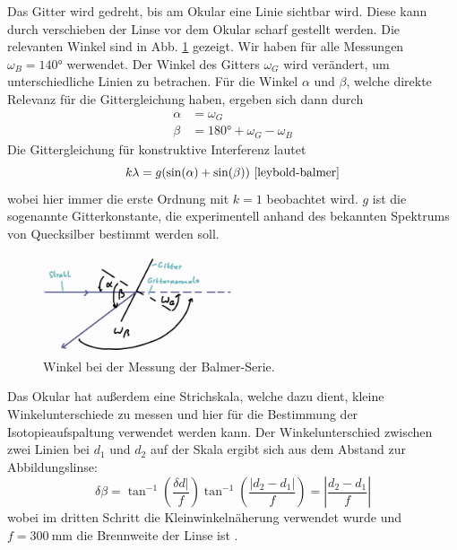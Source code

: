 \documentclass{article}
\begin{document}
Das Gitter wird gedreht, bis am Okular eine Linie sichtbar wird. Diese kann durch verschieben der Linse vor dem Okular scharf gestellt werden.
Die relevanten Winkel sind in Abb. \ref{fig:balmer-winkel} gezeigt. Wir haben für alle Messungen $\omega_B = \ang{140}$ werwendet.
Der Winkel des Gitters $\omega_G$ wird verändert, um unterschiedliche Linien zu betrachen. Für die Winkel $\alpha$ und $\beta$, welche
direkte Relevanz für die Gittergleichung haben, ergeben sich dann durch
\begin{align}
  \alpha &= \omega_G \nonumber \\
  \beta &= \ang{180} + \omega_G - \omega_B \label{eq:balmer-winkel}
\end{align}
Die Gittergleichung für konstruktive Interferenz lautet
\begin{equation}
  k\lambda = g(\sin(\alpha) + \sin(\beta)) \label{eq:gittergleichung}\ \cite{leybold-balmer}
\end{equation}
wobei hier immer die erste Ordnung mit $k=1$ beobachtet wird. $g$ ist die sogenannte Gitterkonstante,
die experimentell anhand des bekannten Spektrums von Quecksilber bestimmt werden soll.

\begin{figure}[h]
  \centering
  \includegraphics[width=0.5\textwidth]{balmer-winkel}
  \caption{Winkel bei der Messung der Balmer-Serie.}
  \label{fig:balmer-winkel}
\end{figure}

Das Okular hat außerdem eine Strichskala, welche dazu dient, kleine Winkelunterschiede zu messen und
hier für die Bestimmung der Isotopieaufspaltung verwendet werden kann.
Der Winkelunterschied zwischen zwei Linien bei $d_1$ und $d_2$ auf der Skala ergibt sich aus dem Abstand zur Abbildungslinse:
\begin{equation}
  \delta \beta = \tan^{-1}\left(\frac{\delta d \rvert}{f}\right) \tan^{-1}\left(\frac{\lvert d_2-d_1 \rvert}{f}\right) = \left\lvert \frac{d_2-d_1}{f} \right\rvert \label{eq:winkelunterschied}
\end{equation}
wobei im dritten Schritt die Kleinwinkelnäherung verwendet wurde und $f=\SI{300}{\mm}$ die Brennweite der Linse ist \cite{Anleitung}.
\end{document}
